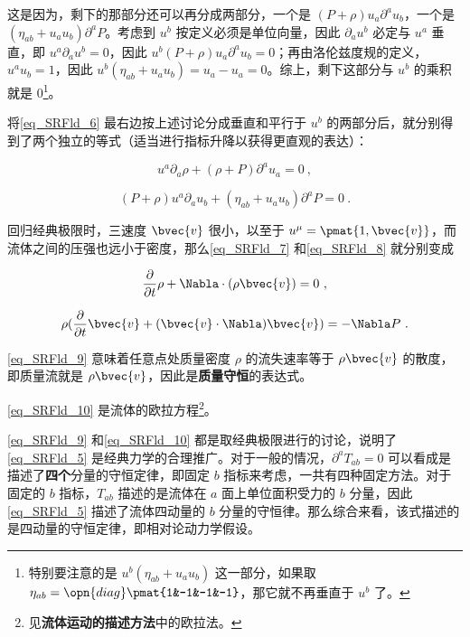 这是因为，剩下的那部分还可以再分成两部分，一个是 $(P+\rho)u_a\partial^au_b$，一个是 $(\eta_{ab}+u_au_b)\partial^aP$。考虑到 $u^b$ 按定义必须是单位向量，因此 $\partial_au^b$ 必定与 $u^a$ 垂直，即 $u^a\partial_au^b=0$，因此 $u^b(P+\rho)u_a\partial^au_b=0$；再由洛伦兹度规的定义，$u^au_b=1$，因此 $u^b(\eta_{ab}+u_au_b)=u_a-u_a=0$。综上，剩下这部分与 $u^b$ 的乘积就是 $0$\footnote{特别要注意的是 $u^b(\eta_{ab}+u_au_b)$ 这一部分，如果取 $\eta_{ab}=\opn{diag}\pmat{1&-1&-1&-1}$，那它就不再垂直于 $u^b$ 了。}。

将\autoref{eq_SRFld_6} 最右边按上述讨论分成垂直和平行于 $u^b$ 的两部分后，就分别得到了两个独立的等式（适当进行指标升降以获得更直观的表达）：

\begin{equation}\label{eq_SRFld_7}
u^a\partial_a\rho+(\rho+P)\partial^au_a=0~,
\end{equation}

\begin{equation}\label{eq_SRFld_8}
(P+\rho)u^a\partial_au_b+(\eta_{ab}+u_au_b)\partial^aP=0~.
\end{equation}

回归经典极限时，三速度 $\bvec{v}$ 很小，以至于 $u^\mu=\pmat{1, \bvec{v}}$，而流体之间的压强也远小于密度，那么\autoref{eq_SRFld_7} 和\autoref{eq_SRFld_8} 就分别变成

\begin{equation}\label{eq_SRFld_9}
\frac{\partial}{\partial t}\rho+\Nabla\cdot(\rho\bvec{v})=0~,
\end{equation}

\begin{equation}\label{eq_SRFld_10}
\rho(\frac{\partial}{\partial t}\bvec{v}+(\bvec{v}\cdot\Nabla)\bvec{v})=-\Nabla P~.
\end{equation}

\autoref{eq_SRFld_9} 意味着任意点处质量密度 $\rho$ 的流失速率等于 $\rho\bvec{v}$ 的散度，即质量流就是 $\rho\bvec{v}$，因此是\textbf{质量守恒}的表达式。

\autoref{eq_SRFld_10} 是流体的欧拉方程\footnote{见\textbf{流体运动的描述方法}中的欧拉法。}。

\autoref{eq_SRFld_9} 和\autoref{eq_SRFld_10} 都是取经典极限进行的讨论，说明了\autoref{eq_SRFld_5} 是经典力学的合理推广。对于一般的情况，$\partial^aT_{ab}=0$ 可以看成是描述了\textbf{四个}分量的守恒定律，即固定 $b$ 指标来考虑，一共有四种固定方法。对于固定的 $b$ 指标，$T_{ab}$ 描述的是流体在 $a$ 面上单位面积受力的 $b$ 分量，因此\autoref{eq_SRFld_5} 描述了流体四动量的 $b$ 分量的守恒律。那么综合来看，该式描述的是四动量的守恒定律，即相对论动力学假设。







